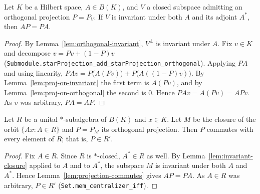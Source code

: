 \begin{lemma}
    \label{lem:projection-commutes}
    \leanok
    Let $K$ be a Hilbert space, $A \in B(K)$, and $V$ a closed subspace
    admitting an orthogonal projection $P = P_V$. If $V$ is invariant under both
    $A$ and its adjoint $A^*$, then $A P = P A$.
\end{lemma}
\begin{proof}
    By Lemma~\ref{lem:orthogonal-invariant}, $V^\perp$ is invariant under $A$.
    Fix $v \in K$ and decompose $v = P v + (1 - P)v$
    (\texttt{Submodule.starProjection\_add\_starProjection\_orthogonal}). Applying
    $P A$ and using linearity,
    $P A v = P\bigl(A(P v)\bigr) + P\bigl(A((1 - P)v)\bigr)$. By
    Lemma~\ref{lem:proj-on-invariant} the first term is $A(P v)$, and by
    Lemma~\ref{lem:proj-on-orthogonal} the second is $0$. Hence
    $P A v = A(P v) = A P v$. As $v$ was arbitrary, $P A = A P$.
\end{proof}

\begin{lemma}
    \label{lem:projection-in-commutant}
    \leanok
    Let $R$ be a unital $*$-subalgebra of $B(K)$ and $x \in K$. Let $M$ be the
    closure of the orbit $\{A x : A \in R\}$ and $P = P_M$ its orthogonal
    projection. Then $P$ commutes with every element of $R$; that is,
    $P \in R'$.
\end{lemma}
\begin{proof}
    Fix $A \in R$. Since $R$ is $*$-closed, $A^* \in R$ as well. By
    Lemma~\ref{lem:invariant-closure} applied to $A$ and to $A^*$, the subspace
    $M$ is invariant under both $A$ and $A^*$. Hence
    Lemma~\ref{lem:projection-commutes} gives $A P = P A$. As $A \in R$ was
    arbitrary, $P \in R'$ (\texttt{Set.mem\_centralizer\_iff}).
\end{proof}


